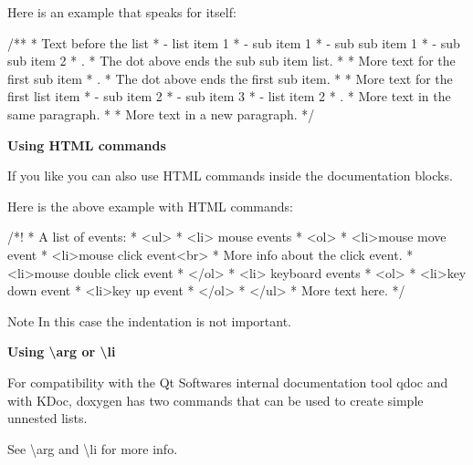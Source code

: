 Here is an example that speaks for itself\+:

\begin{DoxyVerb}/**
 * Text before the list
 * - list item 1
 *   - sub item 1
 *     - sub sub item 1
 *     - sub sub item 2
 *     . 
 *     The dot above ends the sub sub item list.
 *
 *     More text for the first sub item
 *   .
 *   The dot above ends the first sub item.
 *
 *   More text for the first list item
 *   - sub item 2
 *   - sub item 3
 * - list item 2
 * .
 * More text in the same paragraph.
 *
 * More text in a new paragraph.
 */
\end{DoxyVerb}


{\bfseries{Using H\+T\+ML commands}}

If you like you can also use H\+T\+ML commands inside the documentation blocks.

Here is the above example with H\+T\+ML commands\+: \begin{DoxyVerb}  /*! 
   *  A list of events:
   *  <ul>
   *  <li> mouse events
   *     <ol>
   *     <li>mouse move event
   *     <li>mouse click event<br>
   *         More info about the click event.
   *     <li>mouse double click event
   *     </ol>
   *  <li> keyboard events
   *     <ol>     
   *     <li>key down event
   *     <li>key up event
   *     </ol>
   *  </ul>
   *  More text here.
   */
\end{DoxyVerb}


\begin{DoxyNote}{Note}
In this case the indentation is not important.
\end{DoxyNote}
{\bfseries{Using \textbackslash{}arg or \textbackslash{}li}}

For compatibility with the Qt Software\textquotesingle{}s internal documentation tool qdoc and with K\+Doc, doxygen has two commands that can be used to create simple unnested lists.

See \textbackslash{}arg and \textbackslash{}li for more info.

 
